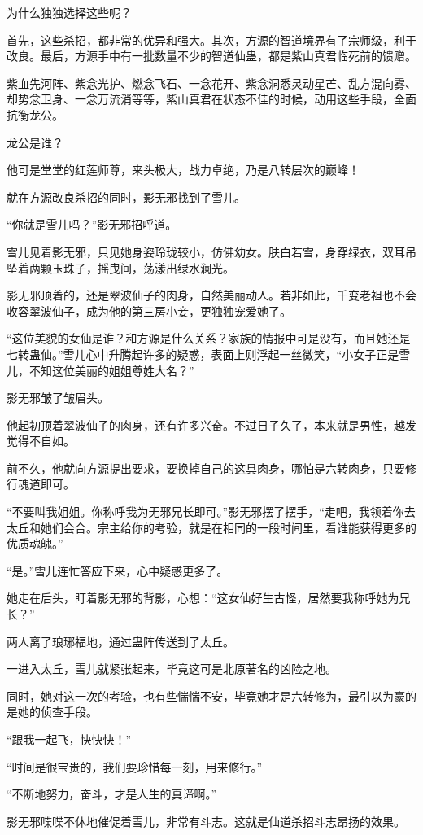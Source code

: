 \begin{this_body}
为什么独独选择这些呢？

首先，这些杀招，都非常的优异和强大。其次，方源的智道境界有了宗师级，利于改良。最后，方源手中有一批数量不少的智道仙蛊，都是紫山真君临死前的馈赠。

紫血先河阵、紫念光护、燃念飞石、一念花开、紫念洞悉灵动星芒、乱方混向雾、却势念卫身、一念万流消等等，紫山真君在状态不佳的时候，动用这些手段，全面抗衡龙公。

龙公是谁？

他可是堂堂的红莲师尊，来头极大，战力卓绝，乃是八转层次的巅峰！

就在方源改良杀招的同时，影无邪找到了雪儿。

“你就是雪儿吗？”影无邪招呼道。

雪儿见着影无邪，只见她身姿玲珑较小，仿佛幼女。肤白若雪，身穿绿衣，双耳吊坠着两颗玉珠子，摇曳间，荡漾出绿水澜光。

影无邪顶着的，还是翠波仙子的肉身，自然美丽动人。若非如此，千变老祖也不会收容翠波仙子，成为他的第三房小妾，更独独宠爱她了。

“这位美貌的女仙是谁？和方源是什么关系？家族的情报中可是没有，而且她还是七转蛊仙。”雪儿心中升腾起许多的疑惑，表面上则浮起一丝微笑，“小女子正是雪儿，不知这位美丽的姐姐尊姓大名？”

影无邪皱了皱眉头。

他起初顶着翠波仙子的肉身，还有许多兴奋。不过日子久了，本来就是男性，越发觉得不自如。

前不久，他就向方源提出要求，要换掉自己的这具肉身，哪怕是六转肉身，只要修行魂道即可。

“不要叫我姐姐。你称呼我为无邪兄长即可。”影无邪摆了摆手，“走吧，我领着你去太丘和她们会合。宗主给你的考验，就是在相同的一段时间里，看谁能获得更多的优质魂魄。”

“是。”雪儿连忙答应下来，心中疑惑更多了。

她走在后头，盯着影无邪的背影，心想：“这女仙好生古怪，居然要我称呼她为兄长？”

两人离了琅琊福地，通过蛊阵传送到了太丘。

一进入太丘，雪儿就紧张起来，毕竟这可是北原著名的凶险之地。

同时，她对这一次的考验，也有些惴惴不安，毕竟她才是六转修为，最引以为豪的是她的侦查手段。

“跟我一起飞，快快快！”

“时间是很宝贵的，我们要珍惜每一刻，用来修行。”

“不断地努力，奋斗，才是人生的真谛啊。”

影无邪喋喋不休地催促着雪儿，非常有斗志。这就是仙道杀招斗志昂扬的效果。


\end{this_body}

